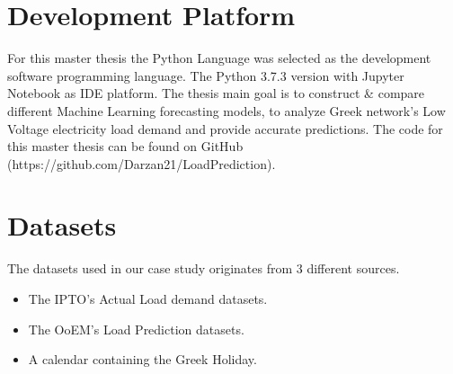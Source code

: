 \section{Development Platform}
For this master thesis the Python Language was selected as the development software programming language. The Python 3.7.3  version with Jupyter Notebook as IDE platform. The thesis main goal is to construct \& compare different Machine Learning forecasting models, to analyze Greek network's Low Voltage electricity load demand and provide accurate predictions. The code for this master thesis can be found on GitHub (https://github.com/Darzan21/LoadPrediction).
\section{Datasets}
The datasets used in our case study originates from 3 different sources.
\begin{itemize}
    \item The IPTO’s Actual Load demand datasets.
    \item The OoEM's Load Prediction datasets.
    \item A calendar containing the Greek Holiday.
\end{itemize}
